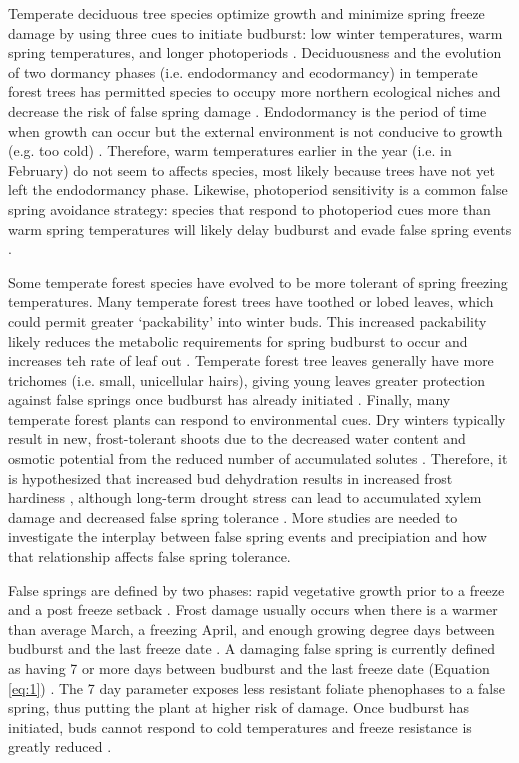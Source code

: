 \documentclass{article}\usepackage[]{graphicx}\usepackage[]{color}
\begin{document}
Temperate deciduous tree species optimize growth and minimize spring freeze damage by using three cues to initiate budburst: low winter temperatures, warm spring temperatures, and longer photoperiods \citep{Cleland2007, Polgar2011}. Deciduousness and the evolution of two dormancy phases (i.e. endodormancy and ecodormancy) in temperate forest trees has permitted species to occupy more northern ecological niches and decrease the risk of false spring damage \citep{Samish1954}. Endodormancy is the period of time when growth can occur but the external environment is not conducive to growth (e.g. too cold) \citep{Basler2012}. Therefore, warm temperatures earlier in the year (i.e. in February) do not seem to affects species, most likely because trees have not yet left the endodormancy phase. Likewise, photoperiod sensitivity is a common false spring avoidance strategy: species that respond to photoperiod cues more than warm spring temperatures will likely delay budburst and evade false spring events \citep{Basler2014}.

Some temperate forest species have evolved to be more tolerant of spring freezing temperatures. Many temperate forest trees have toothed or lobed leaves, which could permit greater `packability' into winter buds. This increased packability likely reduces the metabolic requirements for spring budburst to occur and increases teh rate of leaf out \citep{Edwards2017}. Temperate forest tree leaves generally have more trichomes (i.e. small, unicellular hairs), giving young leaves greater protection against false springs once budburst has already initiated \citep{Agrawal2004}. Finally, many temperate forest plants can respond to environmental cues. Dry winters typically result in new, frost-tolerant shoots due to the decreased water content and osmotic potential from the reduced number of accumulated solutes \citep{Morin2007, Hofmann2015}. Therefore, it is hypothesized that increased bud dehydration results in increased frost hardiness \citep{Beck2007, Nielsen2009, Poirier2010, Kathke2011, Hofmann2015}, although long-term drought stress can lead to accumulated xylem damage and decreased false spring tolerance \citep{Anderegg2013}. More studies are needed to investigate the interplay between false spring events and precipiation and how that relationship affects false spring tolerance. 

False springs are defined by two phases: rapid vegetative growth prior to a freeze and a post freeze setback \citep{Gu2008}. Frost damage usually occurs when there is a warmer than average March, a freezing April, and enough growing degree days between budburst and the last freeze date \citep{Augspurger2013}. A damaging false spring is currently defined as having 7 or more days between budburst and the last freeze date (Equation \ref{eq:1}) \citep{Peterson2014}. The 7 day parameter exposes less resistant foliate phenophases to a false spring, thus putting the plant at higher risk of damage. Once budburst has initiated, buds cannot respond to cold temperatures and freeze resistance is greatly reduced \citep{Taschler2004, Lenz2013, Vitasse2014}.
\end{document}
